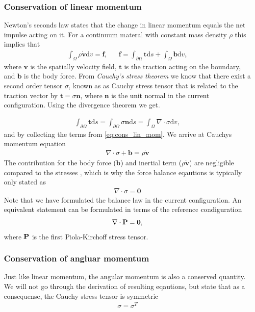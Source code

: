 \subsubsection{Conservation of linear momentum}
Newton's seconds law states that the change in linear momentum equals
the net impulse acting on it. For a continuum materal with constant
mass density $\rho$ this implies that
\begin{align}
  \int_{\Omega} \rho \dot{\mathbf{v}} \mathrm{d}v = \mathbf{f},
  && \mathbf{f} = \int_{\partial \Omega} \mathbf{t} \mathrm{d}s
     + \int_{\Omega} \mathbf{b} \mathrm{d}v,
     \label{eq:cons_lin_mom}
\end{align}
where $\mathbf{v}$ is the spatially velocity field, $\mathbf{t}$ is
the traction acting on the boundary, and $\mathbf{b}$ is the body
force. From \emph{Cauchy's stress theorem} we know that there exist a
second order tensor $\sigma$, known as as Cauchy stress tensor that is
related to the traction vector by $\mathbf{t} = \sigma \mathbf{n}$,
where $\mathbf{n}$ is the unit normal in the current configuration.
Using the divergence theorem we get.

\begin{align*}
  \int_{\partial \Omega} \mathbf{t} \mathrm{d}s
  = \int_{\partial \Omega} \sigma \mathbf{n} \mathrm{d}s
  = \int_{\Omega} \nabla \cdot \sigma \mathrm{d}v,
\end{align*}
and by collecting the terms from \eqref{eq:cons_lin_mom}. We arrive at
Cauchys momentum equation
\begin{align}
  \nabla \cdot \sigma + \mathbf{b} =  \rho \dot{\mathbf{v}}
  \label{eq:chauch_momentum_eq}
\end{align}
The contribution for the body force ($\mathbf{b}$)  and inertial term
($\rho \dot{\mathbf{v}}$) are negligible compared to the stresses
\cite{hunter1996kd,tallarida1970left}, which is why the force balance
eqautions is typically only stated as
\begin{align}
  \nabla \cdot \sigma = \mathbf{0}
  \label{eq:force_balance_strong}
\end{align}
Note that we have formulated the balance law in the current
configuration. An equivalent statement can be formulated in terms of
the reference condiguration
\begin{align}
  \nabla \cdot \mathbf{P} = \mathbf{0}, 
  \label{eq:force_balance_strong_ref}
\end{align}
where $\mathbf{P}$ is the first Piola-Kirchoff stress tensor.

\subsubsection{Conservation of angluar momentum}
Just like linear momentum, the angular momentum is also a conserved
quantity. We will not go through the derivation of resulting
eqautions, but state that as a consequense, the Cauchy stress tensor is
symmetric
\begin{align}
  \sigma = \sigma^T
\end{align}



